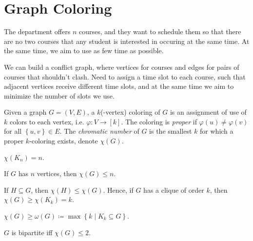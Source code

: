 \chapter{Graph Coloring}
\begin{eg}
    The department offers \(n\) courses, and they want to schedule them so that there are no two courses that any student is interested in occuring at the same time. At the same time, we aim to use as few time as possible.   
\end{eg}

We can build a conflict graph, where vertices for courses and edges for pairs of courses that shouldn't clash. Need to assign a time slot to each course, such that adjacent vertices receive different time slots, and at the same time we aim to minimize the number of slots we use.

\begin{definition}
    Given a graph \(G = (V, E)\), a \(k\)(-vertex) coloring of \(G\) is an assignment of use of \(k\) colors to each vertex, i.e. \(\varphi : V \to [k]\). The coloring is \emph{proper} if \(\varphi (u) \neq \varphi (v)\) for all \(\left\{ u, v \right\} \in E \). The \emph{chromatic number} of \(G\) is the smallest \(k\) for which a proper \(k\)-coloring exists, denote \(\chi (G)\).          
\end{definition}

\begin{eg}
    \(\chi (K_n) = n\). 
\end{eg}

\begin{remark}
    If \(G\) has \(n\) vertices, then \(\chi (G) \le n\).   
\end{remark}

\begin{remark}
    If \(H \subseteq G\), then \(\chi (H) \le \chi (G)\). Hence, if \(G\) has a clique of order \(k\), then \(\chi (G) \ge \chi (K_k) = k\).      
\end{remark}

\begin{claim}
    \(\chi (G) \ge \omega (G) \coloneqq \max \left\{ k \mid K_k \subseteq G \right\} \). 
\end{claim}

\begin{definition}
    \(G\) is bipartite iff \(\chi (G) \le 2\).  
\end{definition}

